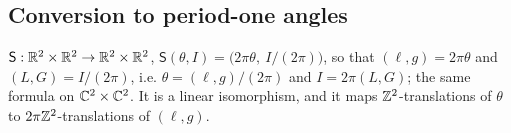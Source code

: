 \subsection{Conversion to period-one angles}\label{bpI:p6:sec-convert}

\begin{definition}\label{bpI:p6:conversion-map}
$\mathsf S:\mathbb{R}^2\times\mathbb{R}^2\to\mathbb{R}^2\times\mathbb{R}^2$, $\mathsf S(\theta,I)=\bigl(2\pi\theta,\ I/(2\pi)\bigr)$, so that
$(\ell,g)=2\pi\theta$ and $(L,G)=I/(2\pi)$, i.e. $\theta=(\ell,g)/(2\pi)$ and $I=2\pi(L,G)$; the same formula on $\mathbb{C}^2\times\mathbb{C}^2$.
It is a linear isomorphism, and it maps $\mathbb{Z}^2$-translations of $\theta$ to $2\pi\mathbb{Z}^2$-translations of $(\ell,g)$.
\end{definition}


